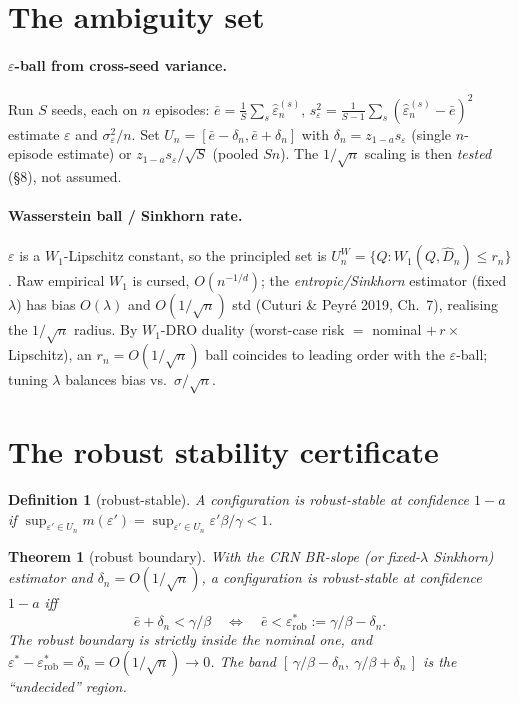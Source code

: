 \documentclass[11pt]{article}
\newtheorem{theorem}{Theorem}
\newtheorem{definition}{Definition}
\newcommand{\eps}{\varepsilon}
\newcommand{\epshat}{\hat\eps_n}
\newcommand{\dn}{\delta_n}
\newcommand{\epsstar}{\eps^{*}}
\newcommand{\epsrob}{\eps^{*}_{\mathrm{rob}}}
\newcommand{\ebar}{\bar e}
\begin{document}
\section{The ambiguity set}

\paragraph{$\eps$-ball from cross-seed variance.}
Run $S$ seeds, each on $n$ episodes: $\ebar=\tfrac1S\sum_s\epshat^{(s)}$,
$s_\eps^2=\tfrac1{S-1}\sum_s(\epshat^{(s)}-\ebar)^2$ estimate $\eps$ and
$\sigma_\eps^2/n$. Set $U_n=[\ebar-\dn,\ebar+\dn]$ with $\dn=z_{1-a}s_\eps$ (single
$n$-episode estimate) or $z_{1-a}s_\eps/\sqrt{S}$ (pooled $Sn$). The $1/\sqrt{n}$
scaling is then \emph{tested} (\S8), not assumed.

\paragraph{Wasserstein ball / Sinkhorn rate.}
$\eps$ is a $W_1$-Lipschitz constant, so the principled set is
$U_n^{W}=\{Q:W_1(Q,\hat D_n)\le r_n\}$. Raw empirical $W_1$ is cursed,
$O(n^{-1/d})$; the \emph{entropic/Sinkhorn} estimator (fixed $\lambda$) has bias
$O(\lambda)$ and $O(1/\sqrt{n})$ std (Cuturi \& Peyr\'e 2019, Ch.~7), realising the
$1/\sqrt{n}$ radius. By $W_1$-DRO duality (worst-case risk $=$ nominal $+\,r\times$
Lipschitz), an $r_n=O(1/\sqrt{n})$ ball coincides to leading order with the
$\eps$-ball; tuning $\lambda$ balances bias vs.\ $\sigma/\sqrt{n}$.

\section{The robust stability certificate}

\begin{definition}[robust-stable]
A configuration is robust-stable at confidence $1-a$ if
$\sup_{\eps'\in U_n} m(\eps')=\sup_{\eps'\in U_n}\eps'\beta/\gamma<1$.
\end{definition}

\begin{theorem}[robust boundary]
With the CRN BR-slope (or fixed-$\lambda$ Sinkhorn) estimator and $\dn=O(1/\sqrt{n})$,
a configuration is robust-stable at confidence $1-a$ iff
%
\[
  \ebar+\dn<\gamma/\beta
  \quad\Longleftrightarrow\quad
  \ebar<\epsrob:=\gamma/\beta-\dn .
\]
%
The robust boundary is strictly inside the nominal one, and
$\epsstar-\epsrob=\dn=O(1/\sqrt{n})\to0$. The band
$[\,\gamma/\beta-\dn,\ \gamma/\beta+\dn\,]$ is the ``undecided'' region.
\end{theorem}
\end{document}
